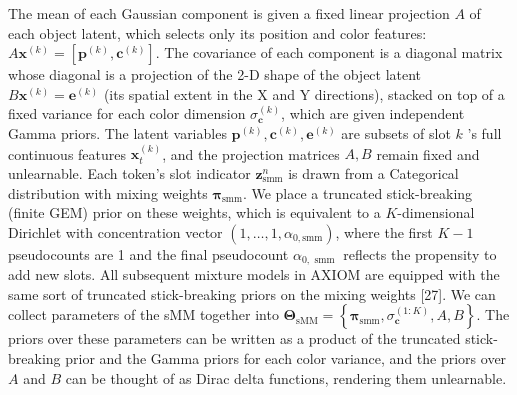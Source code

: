 \documentclass[10pt]{article}
\begin{document}
The mean of each Gaussian component is given a fixed linear projection $A$ of each object latent, which selects only its position and color features: $A \mathbf{x}^{(k)}=\left[\mathbf{p}^{(k)}, \mathbf{c}^{(k)}\right]$. The covariance of each component is a diagonal matrix whose diagonal is a projection of the 2-D shape of the object latent $B \mathbf{x}^{(k)}=\mathbf{e}^{(k)}$ (its spatial extent in the X and Y directions), stacked on top of a fixed variance for each color dimension $\sigma_{\mathbf{c}}^{(k)}$, which are given independent Gamma priors. The latent variables $\mathbf{p}^{(k)}, \mathbf{c}^{(k)}, \mathbf{e}^{(k)}$ are subsets of slot $k$ 's full continuous features $\mathbf{x}_{t}^{(k)}$, and the projection matrices $A, B$ remain fixed and unlearnable. Each token's slot indicator $\mathbf{z}_{\mathrm{smm}}^{n}$ is drawn from a Categorical distribution with mixing weights $\boldsymbol{\pi}_{\mathrm{smm}}$. We place a truncated stick-breaking (finite GEM) prior on these weights, which is equivalent to a $K$-dimensional Dirichlet with concentration vector $\left(1, \ldots, 1, \alpha_{0, \mathrm{smm}}\right)$, where the first $K-1$ pseudocounts are 1 and the final pseudocount $\alpha_{0, \text { smm }}$ reflects the propensity to add new slots. All subsequent mixture models in AXIOM are equipped with the same sort of truncated stick-breaking priors on the mixing weights [27]. We can collect parameters of the sMM together into $\boldsymbol{\Theta}_{\mathrm{sMM}}=\left\{\boldsymbol{\pi}_{\mathrm{smm}}, \sigma_{\mathbf{c}}^{(1: K)}, A, B\right\}$. The priors over these parameters can be written as a product of the truncated stick-breaking prior and the Gamma priors for each color variance, and the priors over $A$ and $B$ can be thought of as Dirac delta functions, rendering them unlearnable.
\end{document}
